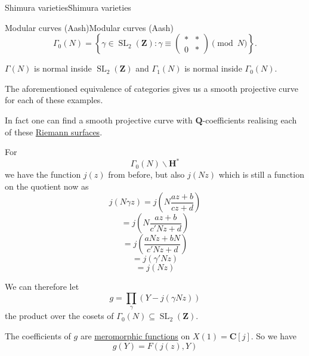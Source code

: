 \documentclass[10pt,]{book}
\numberwithin{equation}{section}
\newcommand{\lb}{[}
\newcommand{\rb}{]}
\newcommand{\ZZ}{\mathbf{Z}}
\newcommand{\QQ}{\mathbf{Q}}
\newcommand{\CC}{\mathbf{C}}
\newcommand{\HH}{\mathbf{H}}
\DeclareMathOperator{\SL}{SL}
\newcommand{\amp}{&}
\begin{document}
\begin{chapterptx}{Shimura varieties}{}{Shimura varieties}{}{}
\begin{sectionptx}{Modular curves (Aash)}{}{Modular curves (Aash)}{}{}
\begin{equation*}
\Gamma_0(N) = \left\{ \gamma \in \SL_2(\ZZ) : \gamma \equiv \begin{pmatrix} \ast\amp\ast \\ 0 \amp \ast \end{pmatrix} \pmod N \right\}\text{.}
\end{equation*}
%
\par
\hypertarget{p-1037}{}%
\(\Gamma(N)\) is normal inside \(\SL_2(\ZZ)\) and \(\Gamma_1(N)\) is normal inside \(\Gamma_0(N)\).%
\par
\hypertarget{p-1038}{}%
The aforementioned equivalence of categories gives us a smooth projective curve for each of these examples.%
\par
\hypertarget{p-1039}{}%
In fact one can find a smooth projective curve with \(\QQ\)-coefficients realising each of these \hyperref[def-top-riem-surface]{Riemann surfaces}.%
\par
\hypertarget{p-1040}{}%
For%
\begin{equation*}
\Gamma_0(N) \backslash \HH^*
\end{equation*}
we have the function \(j(z)\) from before, but also \(j(Nz)\) which is still a function on the quotient now as%
\begin{equation*}
j(N \gamma z) = j\left( N\frac{az + b}{cz+d} \right)
\end{equation*}
%
\begin{equation*}
= j\left( N\frac{az + b}{c'Nz+d} \right)
\end{equation*}
%
\begin{equation*}
= j\left( \frac{aNz + bN}{c'Nz+d} \right)
\end{equation*}
%
\begin{equation*}
= j\left( \gamma ' Nz\right)
\end{equation*}
%
\begin{equation*}
= j\left( Nz\right)
\end{equation*}
%
\par
\hypertarget{p-1041}{}%
We can therefore let%
\begin{equation*}
g = \prod_{\gamma} (Y - j(\gamma Nz))
\end{equation*}
the product over the cosets of \(\Gamma_0(N) \subseteq \SL_2(\ZZ)\).%
\par
\hypertarget{p-1042}{}%
The coefficients of \(g\) are \hyperref[def-morph-riem-surf]{meromorphic functions} on \(X(1) = \CC\lb j \rb\). So we have%
\begin{equation*}
g(Y) = F(j(z), Y)
\end{equation*}

\end{sectionptx}
\end{chapterptx}
\end{document}
